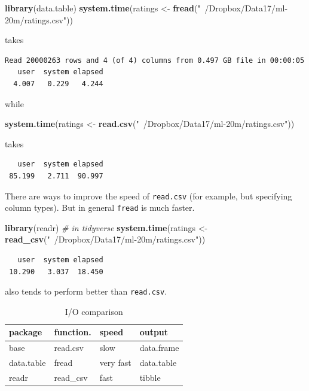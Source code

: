 \documentclass[]{book}
\newenvironment{Shaded}{\begin{snugshade}}{\end{snugshade}}
\newcommand{\KeywordTok}[1]{\textcolor[rgb]{0.13,0.29,0.53}{\textbf{#1}}}
\newcommand{\StringTok}[1]{\textcolor[rgb]{0.31,0.60,0.02}{#1}}
\newcommand{\CommentTok}[1]{\textcolor[rgb]{0.56,0.35,0.01}{\textit{#1}}}
\newcommand{\NormalTok}[1]{#1}
\theoremstyle{definition}
\theoremstyle{definition}
\theoremstyle{definition}
\theoremstyle{remark}
\begin{document}
\begin{Shaded}
\begin{Highlighting}[]
\KeywordTok{library}\NormalTok{(data.table)}
\KeywordTok{system.time}\NormalTok{(ratings <-}\StringTok{ }\KeywordTok{fread}\NormalTok{(}\StringTok{"~/Dropbox/Data17/ml-20m/ratings.csv"}\NormalTok{))}
\end{Highlighting}
\end{Shaded}

takes

\begin{verbatim}
Read 20000263 rows and 4 (of 4) columns from 0.497 GB file in 00:00:05
   user  system elapsed 
  4.007   0.229   4.244
\end{verbatim}

while

\begin{Shaded}
\begin{Highlighting}[]
\KeywordTok{system.time}\NormalTok{(ratings <-}\StringTok{ }\KeywordTok{read.csv}\NormalTok{(}\StringTok{"~/Dropbox/Data17/ml-20m/ratings.csv"}\NormalTok{))}
\end{Highlighting}
\end{Shaded}

takes

\begin{verbatim}
   user  system elapsed 
 85.199   2.711  90.997 
\end{verbatim}

There are ways to improve the speed of \texttt{read.csv} (for example,
but specifying column types). But in general \texttt{fread} is much
faster.

\begin{Shaded}
\begin{Highlighting}[]
\KeywordTok{library}\NormalTok{(readr) }\CommentTok{# in tidyverse}
\KeywordTok{system.time}\NormalTok{(ratings <-}\StringTok{ }\KeywordTok{read_csv}\NormalTok{(}\StringTok{"~/Dropbox/Data17/ml-20m/ratings.csv"}\NormalTok{))}
\end{Highlighting}
\end{Shaded}

\begin{verbatim}
   user  system elapsed 
 10.290   3.037  18.450 
\end{verbatim}

also tends to perform better than \texttt{read.csv}.

\begin{table}

\caption{\label{tab:unnamed-chunk-109}I/O comparison}
\centering
\begin{tabular}[t]{l|l|l|l}
\hline
package & function. & speed & output\\
\hline
base & read.csv & slow & data.frame\\
\hline
data.table & fread & very fast & data.table\\
\hline
readr & read\_csv & fast & tibble\\
\hline
\end{tabular}
\end{table}
\end{document}
